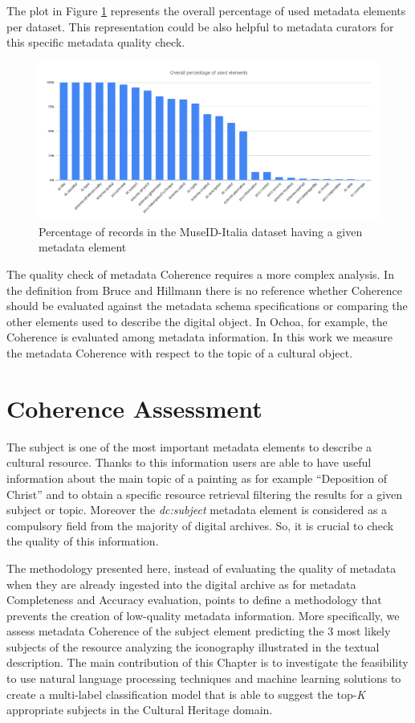 \documentclass[epsfig,a4paper,12pt,titlepage]{book}
\begin{document}
The plot in Figure \ref{consistency_overall} represents the overall percentage of used metadata elements per dataset. This representation could be also helpful to metadata curators for this specific metadata quality check.

\begin{figure}[H]
\includegraphics[width=16cm]{mdi_total.png}
\caption{Percentage of records in the MuseID-Italia dataset having a given metadata element}
\label{consistency_overall}
\end{figure}

The quality check of metadata Coherence requires a more complex analysis. In the definition from Bruce and Hillmann there is no reference whether Coherence should be evaluated against the metadata schema specifications or comparing the other elements used to describe the digital object. In Ochoa, for example, the Coherence is evaluated among metadata information. In this work we measure the metadata Coherence with respect to the topic of a cultural object.
 
\section{Coherence Assessment}
\label{coherence_assessment}
The subject is one of the most important metadata elements to describe a cultural resource. Thanks to this information users are able to have useful information about the main topic of a painting as for example ``Deposition of Christ'' and to obtain a specific resource retrieval filtering the results for a given subject or topic. Moreover the \textit{dc:subject} metadata element is considered as a compulsory field from the majority of digital archives. So, it is crucial to check the quality of this information.           

The methodology presented here, instead of evaluating the quality of metadata when they are already ingested into the digital archive as for metadata Completeness and Accuracy evaluation, points to define a methodology that prevents the creation of low-quality metadata information. More specifically, we assess metadata Coherence of the subject element predicting the 3 most likely subjects of the resource analyzing the iconography illustrated in the textual description. 
The main contribution of this Chapter is to investigate the feasibility to use natural language processing techniques and machine learning solutions to create a multi-label classification model that is able to suggest the top-\textit{K} appropriate subjects in the Cultural Heritage domain.
\end{document}
